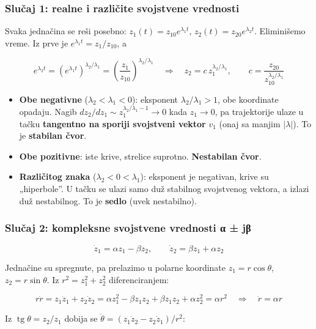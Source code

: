 \documentclass[11pt,a4paper,parskip=half,headsepline,numbers=noenddot]{scrartcl}
\begin{document}
\subsubsection{Slučaj 1: realne i različite svojstvene vrednosti}

Svaka jednačina se reši posebno: \(z_1(t) = z_{10}e^{\lambda_1 t}\), \(z_2(t) = z_{20}e^{\lambda_2 t}\). Eliminišemo vreme. Iz prve je \(e^{\lambda_1 t} = z_1/z_{10}\), a

\[e^{\lambda_2 t} = \left(e^{\lambda_1 t}\right)^{\lambda_2/\lambda_1} = \left(\frac{z_1}{z_{10}}\right)^{\lambda_2/\lambda_1} \quad\Rightarrow\quad z_2 = c\, z_1^{\lambda_2/\lambda_1}, \qquad c = \frac{z_{20}}{z_{10}^{\lambda_2/\lambda_1}}\]

\begin{itemize}
\item \textbf{Obe negativne} (\(\lambda_2 < \lambda_1 < 0\)): eksponent \(\lambda_2/\lambda_1 > 1\), obe koordinate opadaju. Nagib \(dz_2/dz_1 \sim z_1^{\lambda_2/\lambda_1 - 1} \to 0\) kada \(z_1 \to 0\), pa trajektorije ulaze u tačku \textbf{tangentno na sporiji svojstveni vektor} \(v_1\) (onaj sa manjim \(|\lambda|\)). To je \textbf{stabilan čvor}.
\item \textbf{Obe pozitivne}: iste krive, strelice suprotno. \textbf{Nestabilan čvor}.
\item \textbf{Različitog znaka} (\(\lambda_2 < 0 < \lambda_1\)): eksponent je negativan, krive su „hiperbole''. U tačku se ulazi samo duž stabilnog svojstvenog vektora, a izlazi duž nestabilnog. To je \textbf{sedlo} (uvek nestabilno).
\end{itemize}

\subsubsection{Slučaj 2: kompleksne svojstvene vrednosti α ± jβ}

\[\dot z_1 = \alpha z_1 - \beta z_2, \qquad \dot z_2 = \beta z_1 + \alpha z_2\]

Jednačine su spregnute, pa prelazimo u polarne koordinate \(z_1 = r\cos\theta\), \(z_2 = r\sin\theta\). Iz \(r^2 = z_1^2 + z_2^2\) diferenciranjem:

\[r\dot r = z_1\dot z_1 + z_2\dot z_2 = \alpha z_1^2 - \beta z_1z_2 + \beta z_1 z_2 + \alpha z_2^2 = \alpha r^2 \quad\Rightarrow\quad \dot r = \alpha r\]

Iz \(\operatorname{tg}\theta = z_2/z_1\) dobija se \(\dot\theta = (z_1\dot z_2 - z_2\dot z_1)/r^2\):
\end{document}
